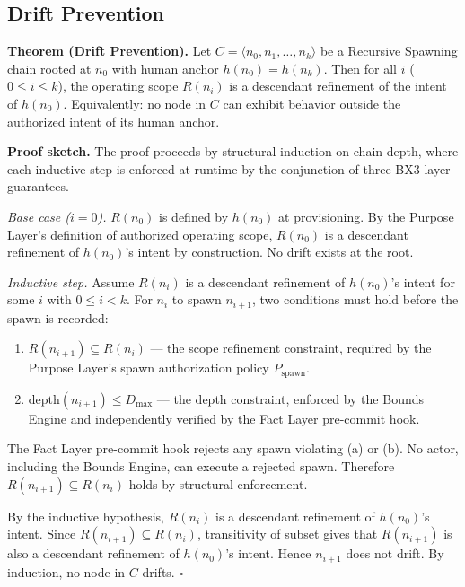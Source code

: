 \subsection{Drift Prevention}
\label{sec:rs-drift-prevention}

\medskip
\noindent\textbf{Theorem (Drift Prevention).} Let $C = \langle n_0, n_1, \ldots, n_k \rangle$ be a Recursive Spawning chain rooted at $n_0$ with human anchor $h(n_0) = h(n_k)$. Then for all $i$ ($0 \leq i \leq k$), the operating scope $R(n_i)$ is a descendant refinement of the intent of $h(n_0)$. Equivalently: no node in $C$ can exhibit behavior outside the authorized intent of its human anchor.

\medskip
\noindent\textbf{Proof sketch.} The proof proceeds by structural induction on chain depth, where each inductive step is enforced at runtime by the conjunction of three BX3-layer guarantees.

\medskip
\textit{Base case ($i=0$).} $R(n_0)$ is defined by $h(n_0)$ at provisioning. By the Purpose Layer's definition of authorized operating scope, $R(n_0)$ is a descendant refinement of $h(n_0)$'s intent by construction. No drift exists at the root.

\medskip
\textit{Inductive step.} Assume $R(n_i)$ is a descendant refinement of $h(n_0)$'s intent for some $i$ with $0 \leq i < k$. For $n_i$ to spawn $n_{i+1}$, two conditions must hold before the spawn is recorded:

\begin{enumerate}
  \item[(a)] $R(n_{i+1}) \subseteq R(n_i)$ — the scope refinement constraint, required by the Purpose Layer's spawn authorization policy $P_{\mathrm{spawn}}$.
  \item[(b)] $\mathrm{depth}(n_{i+1}) \leq D_{\mathrm{max}}$ — the depth constraint, enforced by the Bounds Engine and independently verified by the Fact Layer pre-commit hook.
\end{enumerate}

The Fact Layer pre-commit hook rejects any spawn violating (a) or (b). No actor, including the Bounds Engine, can execute a rejected spawn. Therefore $R(n_{i+1}) \subseteq R(n_i)$ holds by structural enforcement.

By the inductive hypothesis, $R(n_i)$ is a descendant refinement of $h(n_0)$'s intent. Since $R(n_{i+1}) \subseteq R(n_i)$, transitivity of subset gives that $R(n_{i+1})$ is also a descendant refinement of $h(n_0)$'s intent. Hence $n_{i+1}$ does not drift. By induction, no node in $C$ drifts. $\square$

